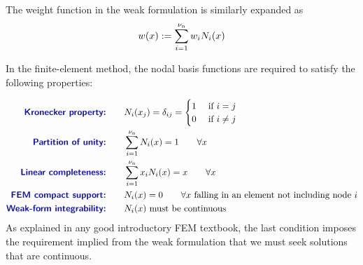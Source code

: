 The weight function in the weak formulation is similarly expanded as
\begin{equation}
  w(x):=\sum\limits_{i=1}^{{\nu_\text{n}}}w_i {N}_i(x)
\label{eq:weightc}
\end{equation}
%

In the finite-element method, the nodal basis functions are required to satisfy the following properties:

\begin{subequations}
\begin{align}
\text{\Defn{Kronecker property:}}\qquad&
\NBF_i(x_j)=\delta_{ij}=\begin{cases}
                                1 &\text{ if }i=j
                                \\
                                0 & \text{ if }i\ne j
                         \end{cases}
\label{eq:oneDRequirementsOnShapeFnsKronecker}
\\
\text{\Defn{Partition of unity:}}\qquad&
\sum\limits_{i=1}^\numnodes \NBF_i(x)=1     \qquad\forall x
\\
\text{\Defn{Linear completeness:}}\qquad&
\sum\limits_{i=1}^\numnodes x_i\NBF_i(x)=x     \qquad\forall x
\\
\text{\Defn{FEM compact support:}}\qquad&
\NBF_i(x)=0 \qquad\forall x 
\text{ falling in an element not including node $i$}
\label{eq:oneDRequirementsOnShapeFnsFEMsupport}
\\
\text{\Defn{Weak-form integrability:}}\qquad&
\NBF_i(x)\text{ must be continuous}
\label{eq:oneDRequirementsOnShapeFnsFEMcontinuity}
\end{align}
\label{eq:oneDRequirementsOnShapeFns}
\end{subequations}
As explained in any good introductory FEM textbook, the last condition imposes the requirement implied from the weak formulation that we must seek solutions that are continuous.

